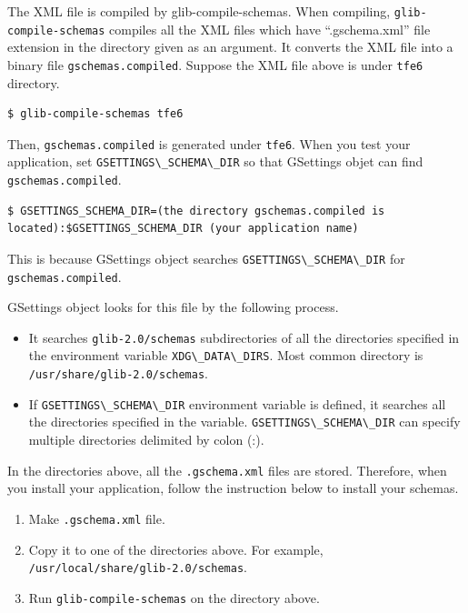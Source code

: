 The XML file is compiled by glib-compile-schemas. When compiling,
\passthrough{\lstinline!glib-compile-schemas!} compiles all the XML
files which have ``.gschema.xml'' file extension in the directory given
as an argument. It converts the XML file into a binary file
\passthrough{\lstinline!gschemas.compiled!}. Suppose the XML file above
is under \passthrough{\lstinline!tfe6!} directory.

\begin{lstlisting}
$ glib-compile-schemas tfe6
\end{lstlisting}

Then, \passthrough{\lstinline!gschemas.compiled!} is generated under
\passthrough{\lstinline!tfe6!}. When you test your application, set
\passthrough{\lstinline!GSETTINGS\_SCHEMA\_DIR!} so that GSettings objet
can find \passthrough{\lstinline!gschemas.compiled!}.

\begin{lstlisting}
$ GSETTINGS_SCHEMA_DIR=(the directory gschemas.compiled is located):$GSETTINGS_SCHEMA_DIR (your application name)
\end{lstlisting}

This is because GSettings object searches
\passthrough{\lstinline!GSETTINGS\_SCHEMA\_DIR!} for
\passthrough{\lstinline!gschemas.compiled!}.

GSettings object looks for this file by the following process.

\begin{itemize}
\tightlist
\item
  It searches \passthrough{\lstinline!glib-2.0/schemas!} subdirectories
  of all the directories specified in the environment variable
  \passthrough{\lstinline!XDG\_DATA\_DIRS!}. Most common directory is
  \passthrough{\lstinline!/usr/share/glib-2.0/schemas!}.
\item
  If \passthrough{\lstinline!GSETTINGS\_SCHEMA\_DIR!} environment
  variable is defined, it searches all the directories specified in the
  variable. \passthrough{\lstinline!GSETTINGS\_SCHEMA\_DIR!} can specify
  multiple directories delimited by colon (:).
\end{itemize}

In the directories above, all the \passthrough{\lstinline!.gschema.xml!}
files are stored. Therefore, when you install your application, follow
the instruction below to install your schemas.

\begin{enumerate}
\def\labelenumi{\arabic{enumi}.}
\tightlist
\item
  Make \passthrough{\lstinline!.gschema.xml!} file.
\item
  Copy it to one of the directories above. For example,
  \passthrough{\lstinline!/usr/local/share/glib-2.0/schemas!}.
\item
  Run \passthrough{\lstinline!glib-compile-schemas!} on the directory
  above.
\end{enumerate}

